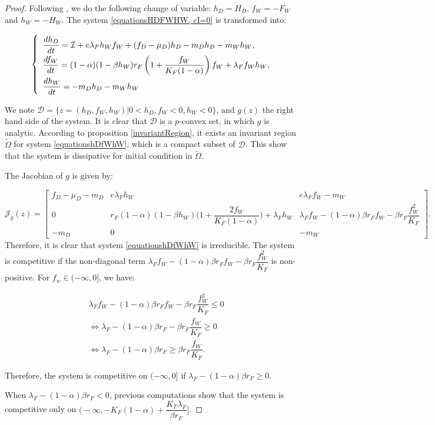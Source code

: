 \documentclass{article}
\newcommand{\lfw}{\lambda_{F}}
\newcommand{\lfw}{\lambda_{F}}
\newcommand{\cI}{\mathcal{I}}
\begin{document}
\begin{proof}
Following \cite{wang_predator-prey_1997}, we do the following change of variable: $h_D =  H_D$, $f_W = -F_W$ and $h_W = -H_W$.  The system \eqref{equationsHDFWHW, cI=0} is transformed into:

\begin{equation}
\def\arraystretch{2}
\left\{ \begin{array}{l}
\dfrac{dh_D}{dt}= \cI + e\lfw h_W f_W + (f_D - \mu_D) h_D - m_D h_D - m_W h_W, \\
\dfrac{df_W}{dt} = (1-\alpha)(1 - \beta h_W) r_F \left(1 + \dfrac{f_W}{K_F(1-\alpha)} \right) f_W + \lfw f_W h_W, \\
\dfrac{dh_W}{dt}= -m_D h_D - m_W h_W 
\end{array} \right.
\label{equationshDfWhW}
\end{equation}


We note $\mathcal{D} = \Big\{z = (h_D, f_W, h_W) | 0 < h_D, f_W < 0, h_W < 0 \Big\}$, and $g(z)$ the right hand side of the system. It is clear that $\mathcal{D}$ is a $p$-convex set, in which $g$ is analytic. According to proposition \ref{invariantRegion}, it exists an invariant region $\tilde{\Omega}$ for system \eqref{equationshDfWhW}, which is a compact subset of $\mathcal{D}$. This show that the system is dissipative for initial condition in  $\tilde{\Omega}$.

The Jacobian of $g$ is given by:

\begin{equation*}
\mathcal{J}_g(z) = \begin{bmatrix}
f_D -\mu_D - m_D & e \lfw h_W & e \lfw f_W - m_W \\
0 & r_F (1-\alpha)(1-\beta h_W) \Big(1 + \dfrac{2 f_W}{K_F(1-\alpha)}\Big) + \lfw  h_W & \lfw f_W - (1-\alpha)\beta r_F f_W - \beta r_F \dfrac{f_W^2}{K_F}\\
-m_D & 0 & -m_W
\end{bmatrix}.
\end{equation*}
Therefore, it is clear that system \eqref{equationshDfWhW} is irreducible. The system is competitive if the non-diagonal term $\lfw f_W - (1-\alpha)\beta r_F f_W - \beta r_F \dfrac{f_W^2}{K_F}$ is non-positive. For $f_w \in (-\infty, 0]$, we have:

\begin{align*}
&\lfw f_W - (1-\alpha)\beta r_F f_W - \beta r_F \dfrac{f_W^2}{K_F} \leq 0 \\
&\Leftrightarrow \lfw - (1-\alpha)\beta r_F - \beta r_F \dfrac{f_W}{K_F} \geq 0 \\
&\Leftrightarrow \lfw - (1-\alpha)\beta r_F \geq \beta r_F \dfrac{f_W}{K_F}.
\end{align*}

Therefore, the system is competitive on $(-\infty, 0]$ if $\lfw - (1-\alpha)\beta r_F \geq 0$. 

When $\lfw - (1-\alpha)\beta r_F<0$, previous computations show that the system is competitive only on $\Big(-\infty, -K_F(1-\alpha) + \dfrac{K_F \lfw}{\beta r_F}\Big]$. 





\end{proof}
\end{document}
